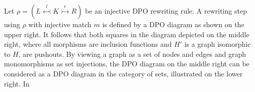 \begin{minipage}{0.59\textwidth}
    Let \( \rho = (L \overset{l}{\leftarrowtail} K \overset{r}{\rightarrowtail} R) \) be an injective DPO rewriting rule. 
    A rewriting step using $\rho$ with injective match \( m \) is defined by a DPO diagram as shown on the upper right.
     It follows that both squares in the diagram depicted on the middle right, where all morphisms are inclusion functions and $H'$ is a graph isomorphic to $H$, are pushouts.
     By viewing a graph as a set of nodes and edges and graph monomorphisms as set injections, the DPO diagram on the middle right can be considered as a DPO diagram in the category of sets, illustrated on the lower right. In
\end{minipage}%
\hfill 
